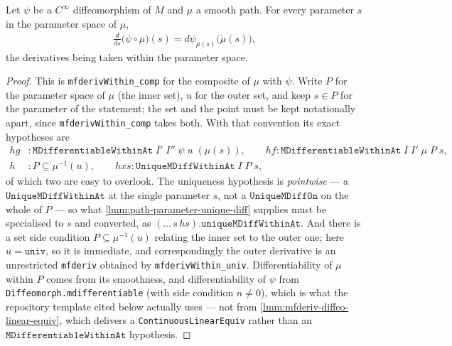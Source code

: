 \begin{lemma}
    \label{lmm:cross-metric-pushforward-path-tangent}
    Let $\psi$ be a $C^\infty$ diffeomorphism of $M$ and $\mu$ a smooth path. For every parameter $s$ in the parameter space of $\mu$,
    \begin{align}
        \tfrac{d}{ds}\big(\psi \circ \mu\big)(s) = d\psi_{\mu(s)}\big(\dot\mu(s)\big),
    \end{align}
    the derivatives being taken within the parameter space.
\end{lemma}
\begin{proof}
    This is \texttt{mfderivWithin\_comp} for the composite of $\mu$ with $\psi$. Write $P$ for the parameter space of $\mu$ (the inner set), $u$ for the outer set, and keep $s \in P$ for the parameter of the statement; the set and the point must be kept notationally apart, since \texttt{mfderivWithin\_comp} takes both. With that convention its exact hypotheses are
    \begin{align}
        hg &: \mathtt{MDifferentiableWithinAt}\;I'\;I''\;\psi\;u\;(\mu(s)), \qquad hf : \mathtt{MDifferentiableWithinAt}\;I\;I'\;\mu\;P\;s, \\
        h &: P \subseteq \mu^{-1}(u), \qquad hxs : \mathtt{UniqueMDiffWithinAt}\;I\;P\;s,
    \end{align}
    of which two are easy to overlook. The uniqueness hypothesis is \emph{pointwise} --- a $\mathtt{UniqueMDiffWithinAt}$ at the single parameter $s$, not a $\mathtt{UniqueMDiffOn}$ on the whole of $P$ --- so what \ref{lmm:path-parameter-unique-diff} supplies must be specialised to $s$ and converted, as $(\dots\,s\,hs).\mathtt{uniqueMDiffWithinAt}$. And there is a set side condition $P \subseteq \mu^{-1}(u)$ relating the inner set to the outer one; here $u = \mathtt{univ}$, so it is immediate, and correspondingly the outer derivative is an unrestricted \texttt{mfderiv} obtained by \texttt{mfderivWithin\_univ}. Differentiability of $\mu$ within $P$ comes from its smoothness, and differentiability of $\psi$ from \texttt{Diffeomorph.mdifferentiable} (with side condition $n \neq 0$), which is what the repository template cited below actually uses --- not from \ref{lmm:mfderiv-diffeo-linear-equiv}, which delivers a \texttt{ContinuousLinearEquiv} rather than an $\mathtt{MDifferentiableWithinAt}$ hypothesis.


\end{proof}

